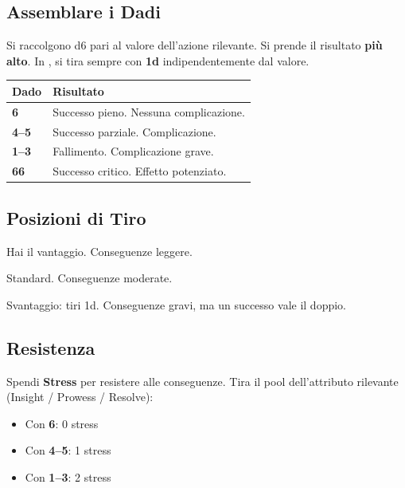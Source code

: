 \begin{multicols}{2}

\subsection{Assemblare i Dadi}

Si raccolgono d6 pari al valore dell'azione rilevante.
Si prende il risultato \textbf{più alto}.
In , si tira sempre con \textbf{1d}
indipendentemente dal valore.

\begin{center}
\begin{tabular}{C{1.2cm} p{4.5cm}}
  \toprule
  \textbf{Dado} & \textbf{Risultato} \\
  \midrule
  \textbf{6}    & Successo pieno. Nessuna complicazione. \\
  \textbf{4–5}  & Successo parziale. Complicazione. \\
  \textbf{1–3}  & Fallimento. Complicazione grave. \\
  \textbf{66}   & Successo critico. Effetto potenziato. \\
  \bottomrule
\end{tabular}
\end{center}

\columnbreak

\subsection{Posizioni di Tiro}

\begin{description}[leftmargin=2cm, labelindent=0pt]
  \item[\idx{Controllata}] Hai il vantaggio. Conseguenze leggere.
  \item[\idx{Rischiosa}]   Standard. Conseguenze moderate.
  \item[\idx{Disperata}]   Svantaggio: tiri 1d. Conseguenze gravi,
                           ma un successo vale il doppio.
\end{description}

\subsection{Resistenza}

Spendi \textbf{Stress} per resistere alle conseguenze.
Tira il pool dell'attributo rilevante (Insight / Prowess / Resolve):
\begin{itemize}
  \item Con \textbf{6}: 0 stress
  \item Con \textbf{4–5}: 1 stress
  \item Con \textbf{1–3}: 2 stress
\end{itemize}

\end{multicols}

